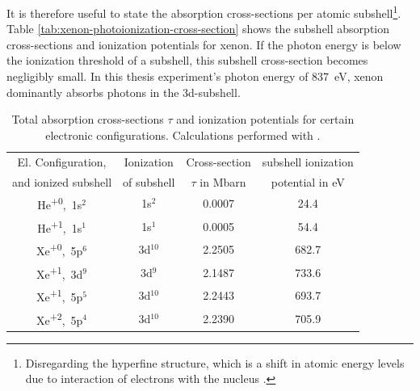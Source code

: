 It is therefore useful to state the absorption cross-sections per atomic subshell\footnote{Disregarding the hyperfine structure, which is a shift in atomic energy levels due to interaction of electrons with the nucleus \citep{Demtroder-2005-Springer}.}. Table \ref{tab:xenon-photoionization-cross-section} shows the subshell absorption cross-sections and ionization potentials for xenon. If the photon energy is below the ionization threshold of a subshell, this subshell cross-section becomes negligibly small. In this thesis experiment's photon energy of \SI{837}{\electronvolt}, xenon dominantly absorbs photons in the 3d-subshell.
\begin{table}
	\centering
		\begin{tabular}{ | c | c | c | c | }
		\hline
			El. Configuration, & Ionization & Cross-section  & subshell ionization  \\
			and ionized subshell & of subshell & $\tau$ in Mbarn & potential in eV \\ \hline
			He\textsuperscript{+0},\ 1s$^{2}$ & 1s$^{2}$ & 0.0007 & 24.4 \\ \hline
			He\textsuperscript{+1},\ 1s$^{1}$ & 1s$^{1}$ & 0.0005 & 54.4 \\ \hline
			Xe\textsuperscript{+0},\ 5p$^{6}$ & 3d$^{10}$ & 2.2505 & 682.7 \\ \hline
			Xe\textsuperscript{+1},\ 3d$^{9}$ & 3d$^{9}$ & 2.1487 & 733.6 \\ \hline
			Xe\textsuperscript{+1},\ 5p$^{5}$ & 3d$^{10}$ & 2.2443 & 693.7 \\ \hline
			Xe\textsuperscript{+2},\ 5p$^{4}$ & 3d$^{10}$ & 2.2390 & 705.9 \\ \hline
		\end{tabular}
	\caption[Absorption cross-sections and ionization potentials for xenon and helium]{Total absorption cross-sections $\tau$ and ionization potentials for certain electronic configurations. Calculations performed with \citep{los-alamos-2016,Cowan-1981-Cal}.}
	\label{tab:helium-xenon-ionization}
\end{table}
